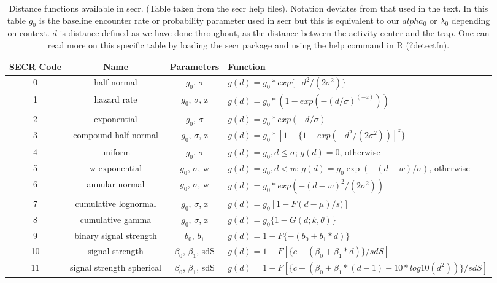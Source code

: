 \begin{table}
\centering
\caption{Distance functions available in secr.  (Table taken from the secr
help files). Notation deviates from that used in the text. 
In this table $g_{0}$ is the baseline encounter rate or probability
parameter used in secr but this is equivalent to our $alpha_{0}$ or
$\lambda_{0}$ depending on context. $d$ is distance defined as we have done throughout,
as the distance between the activity center and the trap.
One can read more on this specific table by loading the secr package and using the 
help command in R (?detectfn). 
}
\begin{tabular}{cccl}
\hline \hline 
SECR Code & Name & Parameters & Function  \\ \hline
0 & half-normal &$g_0$, $\sigma$          &  $g(d) = g_0 * exp\{-d^2 / (2  \sigma^2) \}$  \\
1 &hazard rate  & $g_0$, $\sigma$, z      &  $g(d) = g_0 * (1 - exp(- (d / \sigma) ^(-z) ))$ \\
2 &exponential   &$g_0$, $\sigma$    &  $g(d) = g_0 * exp(- d / \sigma)$ \\
3 &compound half-normal  & $g_0$, $\sigma$, z & $g(d) = g_0 * [1 - \{1 - exp(-d^2 / (2 \sigma^2))]^z\}$ \\
4 &uniform     & $g_0$, $\sigma$     & 
\parbox[t]{2in}{ $g(d) = g_{0}, d \leq \sigma$; \\ 
                 $g(d)= 0$, otherwise 
} \\
5 &w exponential            & $g_0$, $\sigma$, w & 
\parbox[t]{2in}{ $g(d) = g_{0}, d < w$; \\
                 $g(d) = g_{0} \exp(- (d - w) / \sigma)$, otherwise
} \\
6 &annular normal           & $g_0$, $\sigma$, w & $g(d) = g_0 * exp(-(d-w)^2 / (2 \sigma^2))$ \\
7 &cumulative lognormal     & $g_0$, $\sigma$, z & $g(d) = g_0 [1 -F{(d-\mu)/s)}]$  \\
8 &cumulative gamma         & $g_0$, $\sigma$, z  & $g(d) = g_0 \{ 1 - G (d; k,  \theta) \}$  \\
9 &binary signal strength   & $b_0$, $b_1$       & $g(d) = 1 - F \{- (b_0 + b_1 * d) \}$ \\
10&signal strength          & $\beta_0$, $\beta_1$, sdS  & 
  $g(d) = 1 - F[ \{c - (\beta_0 + \beta_1 * d)\} / sdS]$  \\
11&signal strength spherical&  $\beta_0$, $\beta_1$, sdS & $g(d) = 1 - F[\{c - (\beta_0 + \beta_1 * (d-1) - 10 * log10 ( d^2 ) ) \} / sdS ]$
\end{tabular}
\label{covariates.tab.detmodels}
\end{table}

